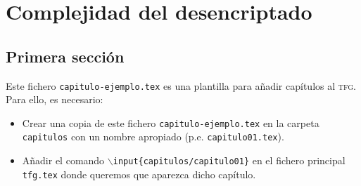 
\chapter{Complejidad del desencriptado}

\section{Primera sección}

Este fichero \texttt{capitulo-ejemplo.tex} es una plantilla para añadir capítulos al \textsc{tfg}. Para ello, es necesario:
\begin{itemize}
  \item Crear una copia de este fichero \texttt{capitulo-ejemplo.tex} en la carpeta \texttt{capitulos} con un nombre apropiado (p.e. \texttt{capitulo01.tex}).
  \item Añadir el comando \texttt{$\backslash$input\{capitulos/capitulo01\}} en el fichero principal \texttt{tfg.tex} donde queremos que aparezca dicho capítulo.
\end{itemize}


\endinput
